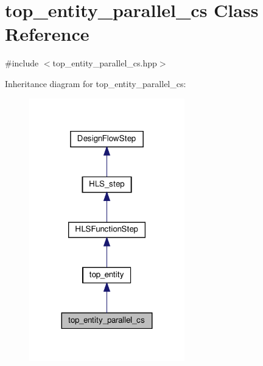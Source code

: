 \hypertarget{classtop__entity__parallel__cs}{}\section{top\+\_\+entity\+\_\+parallel\+\_\+cs Class Reference}
\label{classtop__entity__parallel__cs}


{\ttfamily \#include $<$top\+\_\+entity\+\_\+parallel\+\_\+cs.\+hpp$>$}



Inheritance diagram for top\+\_\+entity\+\_\+parallel\+\_\+cs\+:
\nopagebreak
\begin{figure}[H]
\begin{center}
\leavevmode
\includegraphics[width=191pt]{dd/d5d/classtop__entity__parallel__cs__inherit__graph}
\end{center}
\end{figure}


